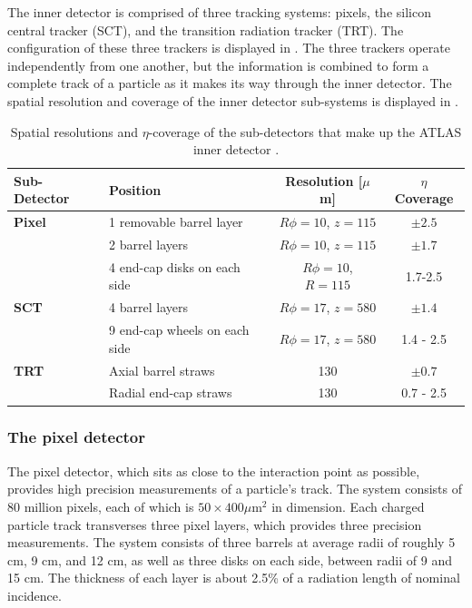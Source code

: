 The inner detector is comprised of three tracking systems: pixels,
the silicon central tracker (SCT), and the transition radiation tracker (TRT).
The configuration of these three trackers is displayed in .
The three trackers operate independently from one another, but the information
is combined to form a complete track of a particle as it makes its way
through the inner detector. The spatial resolution and coverage of the inner detector
sub-systems is displayed in .

\begin{table}[htbp]
  \begin{center}
    \caption{Spatial resolutions and $\eta$-coverage of the sub-detectors
    that make up the ATLAS inner detector \cite{Aad:2008zzm}.}
    \label{tab:spaceres}
    \begin{tabular}{|ll|cc|}
    \hline
    Sub-Detector & Position & Resolution [$\mu$m] & $\eta$ Coverage \\
    \hline
    \textbf{Pixel} & 1 removable barrel layer & $R\phi = 10$, $z = 115$ & $\pm 2.5$ \\
     & 2 barrel layers & $R\phi = 10$, $z = 115$ & $\pm1.7$ \\
     & 4 end-cap disks on each side & $R\phi = 10$, $R = 115$ & 1.7-2.5 \\
    \hline
    \textbf{SCT} & 4 barrel layers & $R\phi = 17$, $z = 580$ &  $\pm 1.4$ \\
     & 9 end-cap wheels on each side & $R\phi = 17$, $z = 580$  & 1.4 - 2.5 \\
    \hline
    \textbf{TRT} & Axial barrel straws & 130 & $\pm 0.7$ \\
     & Radial end-cap straws & 130 & 0.7 - 2.5 \\
    \hline
    \end{tabular}
  \end{center}
\end{table}

\subsubsection*{The pixel detector}
The pixel detector, which sits as close to the interaction point as possible,
provides high precision measurements of a particle's track. The system
consists of 80 million pixels,
each of which is $50 \times 400\mu\mathrm{m}^2$ in dimension. Each charged
particle track transverses three pixel layers, which provides three precision
measurements. The system consists of three barrels at average radii of roughly
5 cm, 9 cm, and 12 cm, 
as well as three disks on each side, between radii of 9 and 15 cm.
The thickness of each layer is about 2.5\% of a radiation length of
nominal incidence.


